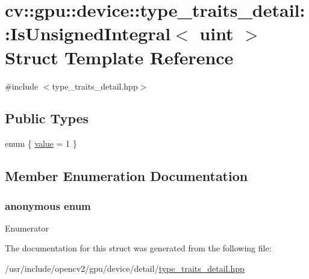 \hypertarget{structcv_1_1gpu_1_1device_1_1type__traits__detail_1_1IsUnsignedIntegral_3_01uint_01_4}{\section{cv\-:\-:gpu\-:\-:device\-:\-:type\-\_\-traits\-\_\-detail\-:\-:Is\-Unsigned\-Integral$<$ uint $>$ Struct Template Reference}
\label{structcv_1_1gpu_1_1device_1_1type__traits__detail_1_1IsUnsignedIntegral_3_01uint_01_4}
}


{\ttfamily \#include $<$type\-\_\-traits\-\_\-detail.\-hpp$>$}

\subsection*{Public Types}
\begin{DoxyCompactItemize}
\item 
enum \{ \hyperlink{structcv_1_1gpu_1_1device_1_1type__traits__detail_1_1IsUnsignedIntegral_3_01uint_01_4_acee692f29396102565aff09feb50a1a3a4757df48f2e6a00a58d8ad1e286c3e75}{value} = 1
 \}
\end{DoxyCompactItemize}


\subsection{Member Enumeration Documentation}
\hypertarget{structcv_1_1gpu_1_1device_1_1type__traits__detail_1_1IsUnsignedIntegral_3_01uint_01_4_acee692f29396102565aff09feb50a1a3}{\subsubsection[{anonymous enum}]{\setlength{\rightskip}{0pt plus 5cm}anonymous enum}}\label{structcv_1_1gpu_1_1device_1_1type__traits__detail_1_1IsUnsignedIntegral_3_01uint_01_4_acee692f29396102565aff09feb50a1a3}
\begin{Desc}
\item[Enumerator]\par
\begin{description}
\item[{\em 
\hypertarget{structcv_1_1gpu_1_1device_1_1type__traits__detail_1_1IsUnsignedIntegral_3_01uint_01_4_acee692f29396102565aff09feb50a1a3a4757df48f2e6a00a58d8ad1e286c3e75}{value}\label{structcv_1_1gpu_1_1device_1_1type__traits__detail_1_1IsUnsignedIntegral_3_01uint_01_4_acee692f29396102565aff09feb50a1a3a4757df48f2e6a00a58d8ad1e286c3e75}
}]\end{description}
\end{Desc}


The documentation for this struct was generated from the following file\-:\begin{DoxyCompactItemize}
\item 
/usr/include/opencv2/gpu/device/detail/\hyperlink{type__traits__detail_8hpp}{type\-\_\-traits\-\_\-detail.\-hpp}\end{DoxyCompactItemize}
